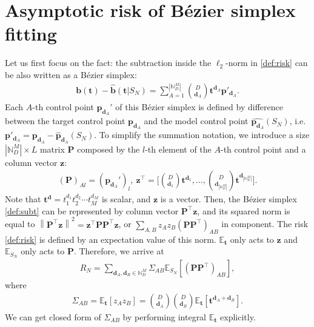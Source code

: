 \documentclass[letterpaper]{article} %
\theoremstyle{plain}
\newcommand{\norm}[1]{\left\| #1 \right\|}
\newcommand{\card}[1]{\left| #1 \right|}
\newcommand{\sqbra}[1]{\left[#1 \right]}
\newcommand{\N}{\mathbb{N}}
\newcommand{\E}{\mathbb{E}}
\newcommand{\ZZ}{\Sigma}
\begin{document}
\section{Asymptotic risk of B\'ezier simplex fitting}\label{sec:asymptotic-risk}
Let us first focus on the fact: the subtraction inside the $\ell_2$-norm in \cref{def:risk} can be also written as a B\'ezier simplex:
\begin{align}
    \bm b(\bm t) - \hat{\bm b}(\bm t | S_N)
    =
    \sum_{A = 1}^{\card{\N_D^M}}
    \binom{D}{\bm d_A} \bm t^{\bm d_A}
    \bm p'_{\bm d_A}.
    \label{def:subt}
\end{align}
Each $A$-th control point $\bm p_{\bm d_A}'$ of this B\'ezier simplex is defined by difference between the target control point $\bm p_{\bm d_A}$ and the model control point $\hat{\bm p_{\bm d_A}}(S_N)$, i.e.~$\bm p'_{\bm d_A} = \bm p_{\bm d_A} - \hat{\bm p}_{\bm d_A}(S_N)$.
To simplify the summation notation, we introduce a size $\card{\N_D^M} \times L$ matrix $\bm P$ composed by the $l$-th element of the $A$-th control point and a column vector $\bm z$:
\begin{align}
    (\bm P)_{Al} = (\bm p_{\bm d_A}')_l, \
    \bm z^\top =
    \Big[
        \binom{D}{\bm d_1} \bm t^{\bm d_1},
        \dots,
        \binom{D}{\bm d_{\card{\N_D^M}}} \bm t^{\bm d_{\card{\N_D^M}}}
    \Big].
    \label{def:Pz}
\end{align}
Note that $\bm t^{\bm d} = t_1^{d_1} t_2^{d_2} \cdots t_M^{d_M}$ is scalar, and $\bm z$ is a vector.
Then, the B\'ezier simplex \cref{def:subt} can be represented by column vector $\bm P^\top \bm z$, and its squared norm is equal to $\norm{\bm P^\top \bm z}^2 = \bm z^\top \bm P \bm P^\top \bm z$, or $\sum_{A, B}z_A z_B (\bm P \bm P^\top )_{AB}$ in component.
The risk \cref{def:risk} is defined by an expectation value of this norm.
$\E_{\bm t}$ only acts to $\bm z$ and $\E_{S_N}$ only acts to $\bm P$.
Therefore, we arrive at
\begin{align}
    R_N
    =
    \sum_{\bm d_A, \bm d_B \in \N_D^M}
    \ZZ_{AB}
    \E_{S_N} \sqbra{({\bm P} {\bm P}^\top)_{AB}},
    \label{eqn:risk}
\end{align}
where
\begin{align}
    \Sigma_{AB}
    =
    \E_{\bm t}[z_A z_B]
    =
    \binom{D}{\bm d_A}
    \binom{D}{\bm d_B}
    \E_{\bm t}[\bm t^{\bm d_A + \bm d_B}].
    \label{def:sigmaexp}
\end{align}
We can get closed form of $\ZZ_{AB}$ by performing integral $\E_{\bm t}$ explicitly.
\end{document}
